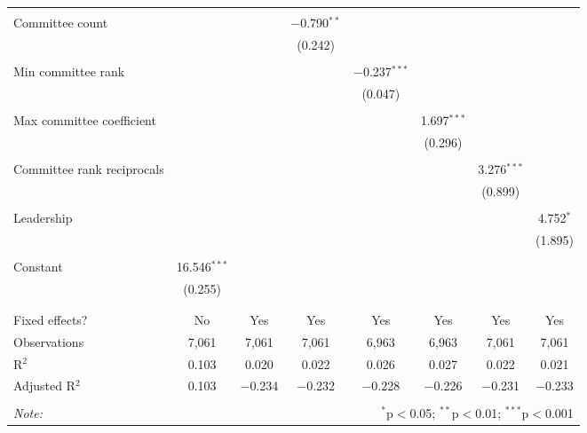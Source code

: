 \documentclass{article}
\begin{document}
\begin{table}[!htbp]
{{\begin{tabular}{@{\extracolsep{5pt}}lccccccc}
          & & & & & & & \\ 
         Committee count &  &  & $-$0.790$^{**}$ &  &  &  &  \\ 
          &  &  & (0.242) &  &  &  &  \\ 
          & & & & & & & \\ 
         Min committee rank &  &  &  & $-$0.237$^{***}$ &  &  &  \\ 
          &  &  &  & (0.047) &  &  &  \\ 
          & & & & & & & \\ 
         Max committee coefficient &  &  &  &  & 1.697$^{***}$ &  &  \\ 
          &  &  &  &  & (0.296) &  &  \\ 
          & & & & & & & \\ 
         Committee rank reciprocals &  &  &  &  &  & 3.276$^{***}$ &  \\ 
          &  &  &  &  &  & (0.899) &  \\ 
          & & & & & & & \\ 
         Leadership &  &  &  &  &  &  & 4.752$^{*}$ \\ 
          &  &  &  &  &  &  & (1.895) \\ 
          & & & & & & & \\ 
         Constant & 16.546$^{***}$ &  &  &  &  &  &  \\ 
          & (0.255) &  &  &  &  &  &  \\ 
          & & & & & & & \\ 
        \hline \\[-1.8ex] 
        Fixed effects? & No & Yes & Yes & Yes & Yes & Yes & Yes \\ 
        Observations & 7,061 & 7,061 & 7,061 & 6,963 & 6,963 & 7,061 & 7,061 \\ 
        R$^{2}$ & 0.103 & 0.020 & 0.022 & 0.026 & 0.027 & 0.022 & 0.021 \\ 
        Adjusted R$^{2}$ & 0.103 & $-$0.234 & $-$0.232 & $-$0.228 & $-$0.226 & $-$0.231 & $-$0.233 \\ 
        \hline 
        \hline \\[-1.8ex] 
        \textit{Note:}  & \multicolumn{7}{r}{$^{*}$p$<$0.05; $^{**}$p$<$0.01; $^{***}$p$<$0.001} \\ 
        \end{tabular} 
    }}
  \end{table} 
\end{document}

